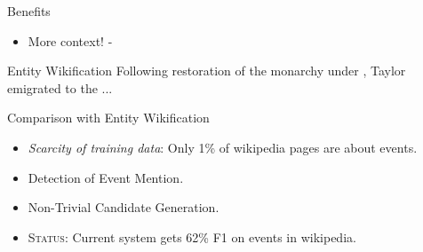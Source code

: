 \begin{frame}{Benefits}
  \begin{itemize}
  \item More context! - 
  \end{itemize}
  \begin{block}{Entity Wikification}
    Following { restoration} of the monarchy under , Taylor emigrated to the ...
  \end{block}
\end{frame}

\begin{frame}{Comparison with Entity Wikification}
  \begin{itemize}[<+->]
  \item \emph{Scarcity of training data}: Only 1\% of wikipedia pages are about events.
  \item Detection of Event Mention.
  \item Non-Trivial Candidate Generation.
  \item \textsc{Status:} Current system gets 62\% F1 on events in wikipedia.
  \end{itemize}
\end{frame}







